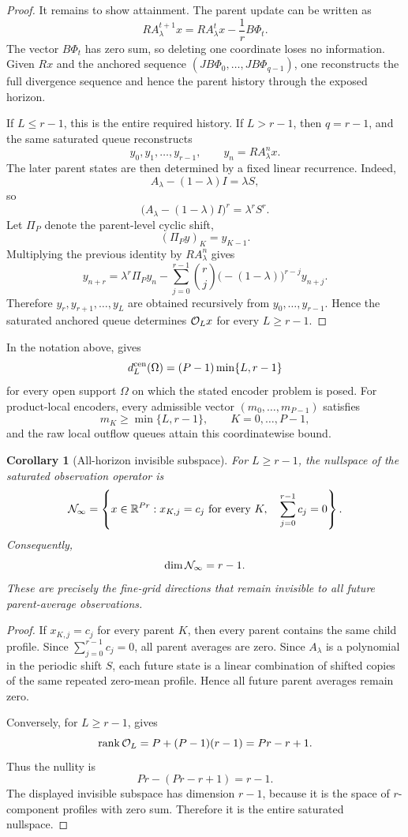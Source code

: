 \documentclass[pdflatex,sn-mathphys-num]{sn-jnl}%
\newtheorem{corollary}{Corollary}
\DeclareMathOperator{\rank}{rank}
\theoremstyle{thmstyleone}%
\theoremstyle{thmstyletwo}%
\theoremstyle{thmstylethree}%
\begin{document}
\begin{proof}
It remains to show attainment.  The parent update can be written as
\[
  RA_\lambda^{t+1}x
  =
  RA_\lambda^t x
  -
  \frac1r B\Phi_t .
\]
The vector \(B\Phi_t\) has zero sum, so deleting one coordinate loses no
information.  Given \(Rx\) and the anchored sequence
\((JB\Phi_0,\ldots,JB\Phi_{q-1})\), one reconstructs the full divergence
sequence and hence the parent history through the exposed horizon.

If \(L\le r-1\), this is the entire required history.  If \(L>r-1\), then
\(q=r-1\), and the same saturated queue reconstructs
\[
  y_0,y_1,\ldots,y_{r-1},
  \qquad
  y_n=RA_\lambda^n x.
\]
The later parent states are then determined by a fixed linear recurrence.
Indeed,
\[
  A_\lambda-(1-\lambda)I=\lambda S,
\]
so
\[
  \bigl(A_\lambda-(1-\lambda)I\bigr)^r
  =
  \lambda^r S^r.
\]
Let \(\Pi_P\) denote the parent-level cyclic shift,
\[
  (\Pi_P y)_K=y_{K-1}.
\]
Multiplying the previous identity by \(RA_\lambda^n\) gives
\[
  y_{n+r}
  =
  \lambda^r \Pi_P y_n
  -
  \sum_{j=0}^{r-1}
  \binom{r}{j}
  \bigl(-(1-\lambda)\bigr)^{r-j}
  y_{n+j}.
\]
Therefore \(y_r,y_{r+1},\ldots,y_L\) are obtained recursively from
\(y_0,\ldots,y_{r-1}\).  Hence the saturated anchored queue determines
\({\cal O}_Lx\) for every \(L\ge r-1\).
\end{proof}
In the notation above,  gives
\[
  d^{\rm cen}_L(\Omega)
  =
  (P-1)\min\{L,r-1\}
\]
for every open support \(\Omega\) on which the stated encoder problem is
posed.  For product-local encoders, every admissible vector
\((m_0,\ldots,m_{P-1})\) satisfies
\[
  m_K\ge \min\{L,r-1\},
  \qquad K=0,\ldots,P-1,
\]
and the raw local outflow queues attain this coordinatewise bound.

\begin{corollary}[All-horizon invisible subspace]
\label{cor:invisible-subspace}
For \(L\ge r-1\), the nullspace of the saturated observation operator is
\[
  {\cal N}_{\infty}
  =
  \left\{
  x\in\mathbb R^{Pr}:
  x_{K,j}=c_j\ \text{for every }K,\quad
  \sum_{j=0}^{r-1}c_j=0
  \right\}.
\]
Consequently,
\[
  \dim {\cal N}_{\infty}=r-1.
\]
These are precisely the fine-grid directions that remain invisible to all
future parent-average observations.
\end{corollary}

\begin{proof}
If \(x_{K,j}=c_j\) for every parent \(K\), then every parent contains the
same child profile.  Since \(\sum_{j=0}^{r-1}c_j=0\), all parent averages are
zero.  Since \(A_\lambda\) is a polynomial in the periodic shift \(S\), each
future state is a linear combination of shifted copies of the same repeated
zero-mean profile.  Hence all future parent averages remain zero.

Conversely, for \(L\ge r-1\),  gives
\[
  \rank {\cal O}_L
  =
  P+(P-1)(r-1)
  =
  Pr-r+1.
\]
Thus the nullity is
\[
  Pr-(Pr-r+1)=r-1.
\]
The displayed invisible subspace has dimension \(r-1\), because it is the
space of \(r\)-component profiles with zero sum.  Therefore it is the entire
saturated nullspace.
\end{proof}
\end{document}
